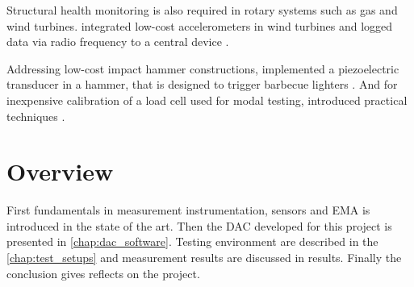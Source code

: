 \newpage
Structural health monitoring is also required in rotary systems such as gas and wind turbines. \citeauthor{esu2014integration} integrated low-cost accelerometers in wind turbines and logged data via radio frequency to a central device \cite{esu2014integration}.

Addressing low-cost impact hammer constructions, \citeauthor{waltham2009construction} implemented a piezoelectric transducer in a hammer, that is designed to trigger barbecue lighters \cite{waltham2009construction}. And for inexpensive calibration of a load cell used for modal testing, \citeauthor{wang2015practical} introduced practical techniques \cite{wang2015practical}.

\section{Overview}

First fundamentals in measurement instrumentation, sensors and \ac{EMA} is introduced in the state of the art. Then the \acf{DAC} developed for this project is presented in \autoref{chap:dac_software}. Testing environment are described in the \autoref{chap:test_setups} and measurement results are discussed in results. Finally the conclusion gives reflects on the project.
